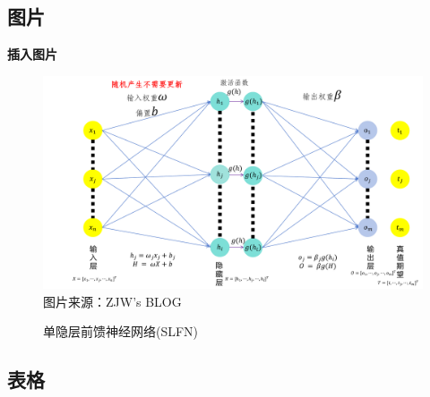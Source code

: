 \documentclass[12pt, aspectratio=169]{beamer}
\begin{document}
\subsection{图片}
\linespread{1}  
\begin{frame}{\textbf{插入图片}}
\linespread{1.5}
	
	\begin{figure}
		\centering %
		\includegraphics[scale=0.3]{Fig/单隐层前馈神经网络(SLFN).pdf}\\ %
		\hspace{-9em}\scriptsize{图片来源：ZJW's BLOG} %
		\vspace{-0.5em} %
		\caption{单隐层前馈神经网络(SLFN)} %
		\label{SLFN} %
	\end{figure}
	
\end{frame}

\subsection{表格}
\end{document}
